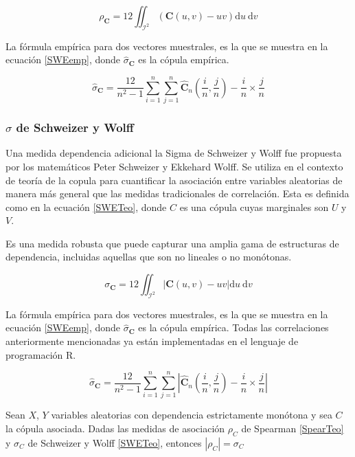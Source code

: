 \begin{equation}\label{SpearTeo}
    \rho_{\mathbf{C}}=12 \iint_{\mathcal{I}^2} (\mathbf{C}(u, v)-u v) \mathrm{d} u \mathrm{~d} v
\end{equation}

La fórmula empírica para dos vectores muestrales, es la que se muestra en la ecuación \eqref{SWEemp}, donde $\hat{\sigma}_{\mathbf{C}}$ es la cópula empírica. 

\begin{equation}\label{Spearemp}
    \hat{\sigma}_{\mathbf{C}}=\frac{12}{n^2-1} \sum_{i=1}^n \sum_{j=1}^n\hat{\mathbf{C}}_n\left(\frac{i}{n}, \frac{j}{n}\right)-\frac{i}{n} \times \frac{j}{n}
\end{equation}
\subsubsection{$\sigma$ de Schweizer y Wolff}

Una medida dependencia adicional la Sigma de Schweizer y Wolff fue propuesta por los matemáticos Peter Schweizer y Ekkehard Wolff. Se utiliza en el contexto de teoría de la copula para cuantificar la asociación entre variables aleatorias de manera más general que las medidas tradicionales de correlación. Esta es definida como en la ecuación \eqref{SWETeo}, donde $C$ es una cópula cuyas marginales son $U$ y $V$.

Es una medida robusta que puede capturar una amplia gama de estructuras de dependencia, incluidas aquellas que son no lineales o no monótonas. 

\begin{equation}\label{SWETeo}
    \sigma_{\mathbf{C}}=12 \iint_{\mathcal{I}^2}|\mathbf{C}(u, v)-u v| \mathrm{d} u \mathrm{~d} v
\end{equation}

La fórmula empírica para dos vectores muestrales, es la que se muestra en la ecuación \eqref{SWEemp}, donde $\hat{\sigma}_{\mathbf{C}}$ es la cópula empírica. Todas las correlaciones anteriormente mencionadas ya están implementadas en el lenguaje de programación R.

\begin{equation}\label{SWEemp}
    \hat{\sigma}_{\mathbf{C}}=\frac{12}{n^2-1} \sum_{i=1}^n \sum_{j=1}^n\left|\hat{\mathbf{C}}_n\left(\frac{i}{n}, \frac{j}{n}\right)-\frac{i}{n} \times \frac{j}{n}\right|
\end{equation}


\begin{propo}
    Sean $X$, $Y$ variables aleatorias con dependencia estrictamente monótona y sea $C$ la cópula asociada. Dadas las medidas de asociación $\rho_C$ de Spearman \eqref{SpearTeo} y $\sigma_C$ de Schweizer y Wolff \eqref{SWETeo}, entonces $|\rho_C| = \sigma_C$
\end{propo}

